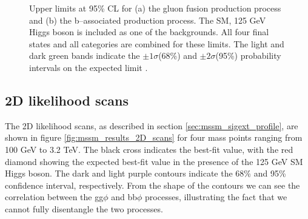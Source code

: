 \begin{figure}[h!]
\begin{center}
\end{center}
\caption{Upper limits at 95\% CL for (a) the gluon fusion production
process and (b) the b--associated production process. The SM, 125 GeV Higgs boson
is included as one of the backgrounds. All four final states and 
all categories are combined for these limits. The light and dark green bands indicate
the $\pm 1\sigma$(68\%) and $\pm 2\sigma$(95\%) probability intervals on the expected limit \cite{CMS-PAS-HIG-16-037-addit}.}
\label{fig:mssm_results_greenband}
\end{figure}


\subsection{2D likelihood scans}
\label{sec:mssm_results_2D}
The 2D likelihood scans, as described in section \ref{sec:mssm_sigext_profile},
are shown in figure \ref{fig:mssm_results_2D_scans}
for four mass points ranging from 100 GeV to 3.2 TeV. The black cross indicates the best-fit value, with the red diamond showing the expected
best-fit value in the presence of the 125 GeV SM Higgs boson. The dark and light purple contours
indicate the 68\% and 95\% confidence interval, respectively.  From the shape of the contours
we can see the correlation between the gg$\phi$ and bb$\phi$ processes, illustrating
the fact that we cannot fully disentangle the two processes.

